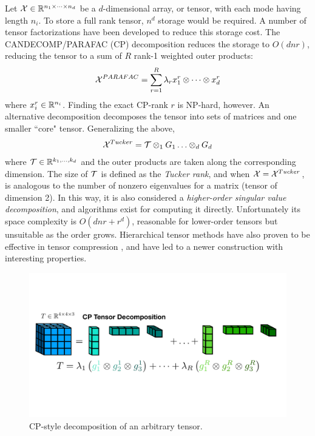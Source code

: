 Let $\mathcal{X} \in \mathbb{R}^{n_1 \times \cdots \times n_d}$ be a $d$-dimensional array, or tensor, with each mode having length $n_i$. To store a full rank tensor, $n^d$ storage would be required.
A number of tensor factorizations have been developed to reduce this storage cost.
The CANDECOMP/PARAFAC (CP) decomposition \citep{harshman1970foundations,carroll1970analysis} reduces the storage to $O(dnr)$,
reducing the tensor to a sum of $R$ rank-1 weighted outer products:
\begin{align}
\mathcal{X}^{PARAFAC} = \sum_{r=1}^R \lambda_r x_1^r \otimes \cdots \otimes x_d^r
\end{align}
where $x_i^r \in \mathbb{R}^{n_i}$. Finding the exact CP-rank $r$ is NP-hard, however.
An alternative decomposition decomposes the tensor into sets of matrices and one smaller ``core" tensor.
Generalizing the above,
\begin{align}
\mathcal{X}^{Tucker} = \mathcal{T} \otimes_1 G_1 \ldots \otimes_d G_d 
\end{align}
where $\mathcal{T} \in \mathbb{R}^{k_1,\ldots,k_d}$ and the outer products are taken along the corresponding dimension.
The size of $\mathcal{T}$ is defined as the \textit{Tucker rank}, and when $\mathcal{X} = \mathcal{X}^{Tucker}$, is analogous to the number of nonzero
eigenvalues for a matrix (tensor of dimension 2).
In this way, it is also considered a \textit{higher-order singular value decomposition},
and algorithms exist for computing it directly.
Unfortunately its space complexity is $O(dnr + r^d)$, reasonable for lower-order tensors
but unsuitable as the order grows.
Hierarchical tensor methods have also proven to be effective in tensor compression \citep{cohen2016expressive, cohen2016convolutional},
and have led to a newer construction with interesting properties.
\begin{figure}
	\centering
	\includegraphics[width=\textwidth,trim={0 9cm 0 10cm},clip]{2_bknd/cpdecomp.pdf}
	\caption[Tensor decompositions]{\label{fig:cp_decomp} CP-style decomposition of an arbitrary tensor.}
\end{figure}

